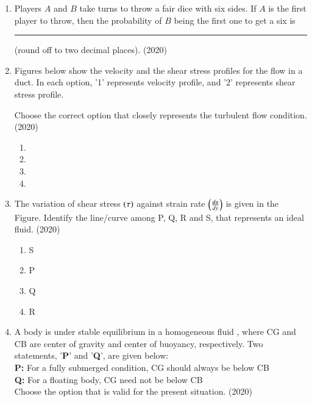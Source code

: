\documentclass[journal]{IEEEtran}
\begin{document}
\begin{enumerate}
    \item Players $A$ and $B$ take turns to throw a fair dice with six sides. If $A$ is the first player to throw, then the probability of $B$ being the first one to get a six is \rule{1cm}{0.15mm} (round off to two decimal places).
    \hfill{(2020)}

        
    \item Figures below show the velocity and the shear stress profiles for the flow in a duct. In each option, '1' represents velocity profile, and '2' represents shear stress profile.

    Choose the correct option that closely represents the turbulent flow condition.
    \hfill{(2020)}

    \begin{multicols}{2}
        \begin{enumerate}
            \item 
            \item 
            \item 
            \item 
        \end{enumerate}
    \end{multicols}

    
    \item The variation of shear stress $\left(\tau\right)$ against strain rate $\left(\frac{du}{dy}\right)$ is given in the Figure. Identify the line/curve among P, Q, R and S, that represents an ideal fluid.
    \hfill{(2020)}

    

    \begin{multicols}{4}
        \begin{enumerate}
            \item S
            \item P
            \item Q
            \item R
        \end{enumerate}
    \end{multicols}

    
    \item A body is under stable equilibrium in a homogeneous fluid , where CG and CB are center of gravity and center of buoyancy, respectively. Two statements, '\textbf{P}' and '\textbf{Q}', are given below:\\
    \textbf{P:} For a fully submerged condition, CG should always be below CB\\
    \textbf{Q:} For a floating body, CG need not be below CB\\
    Choose the option that is valid for the present situation.
    \hfill{(2020)}



\end{enumerate}
\end{document}
